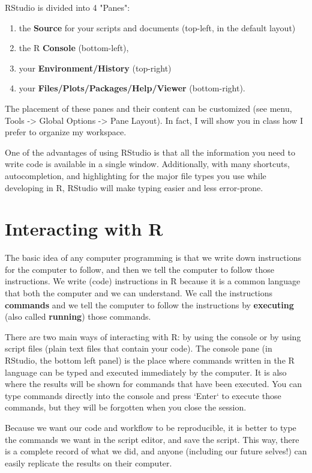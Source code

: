\documentclass[11pt]{article}
\begin{document}
RStudio is divided into 4 "Panes":
\begin{enumerate}
\item the \textbf{Source} for your scripts and documents (top-left, in the default layout)
\item the R \textbf{Console} (bottom-left),
\item your \textbf{Environment/History} (top-right)
\item your \textbf{Files/Plots/Packages/Help/Viewer} (bottom-right).
\end{enumerate}

The placement of these panes and their content can be customized (see menu, Tools -> Global Options -> Pane Layout). In fact, I will show you in class how I prefer to organize my workspace.  

One of the advantages of using RStudio is that all the information you need to write code is available in a single window. Additionally, with many shortcuts, autocompletion, and highlighting for the major file types you use while developing in R, RStudio will make typing easier and less error-prone.

\section*{Interacting with R}
\label{sec-4}

The basic idea of any computer programming is that we write down instructions for the computer to follow, and then we tell the computer to follow those instructions. We write (code) instructions in R because it is a common language that both the computer and we can understand. We call the instructions \textbf{commands} and we tell the computer to follow the instructions by \textbf{executing} (also called \textbf{running}) those commands.

There are two main ways of interacting with R: by using the console or by using script files (plain text files that contain your code). The console pane (in RStudio, the bottom left panel) is the place where commands written in the R language can be typed and executed immediately by the computer. It is also where the results will be shown for commands that have been executed. You can type commands directly into the console and press `Enter` to execute those commands, but they will be forgotten when you close the session.

Because we want our code and workflow to be reproducible, it is better to type the commands we want in the script editor, and save the script. This way, there is a complete record of what we did, and anyone (including our future selves!) can easily replicate the results on their computer.
\end{document}
